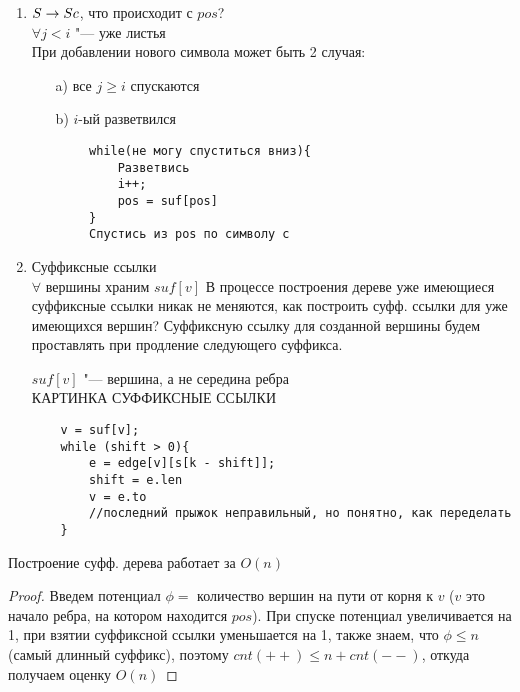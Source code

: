 \begin{enumerate}
\begin{proof}
		КАРТИНКА ДОКАЗАТЕЛЬСТВА ЛЕММЫ
	\end{proof}
	Таким образом, надо поддерживать самый длинный неразретвившийся суффикс, будем хранить его в переменной $pos$, как комбинацию вершины дерева, символа по которому надо пойти и сдвига на ребре ($pos$ может быть на середине ребра), $i$ "--- позиция начала суффикса
\item
	$ S \rightarrow Sc $, что происходит с $pos$? \\
	$\forall j < i$ "--- уже листья \\
	При добавлении нового символа может быть 2 случая:
	\begin{itemize}
	\item[a)]
		все $j \geqslant i$ спускаются
	\item[b)]
		$i$-ый разветвился
	\end{itemize}
	\begin{verbatim}
		while(не могу спуститься вниз){
			Разветвись
			i++;
			pos = suf[pos]
		}
		Спустись из pos по символу c
	\end{verbatim}
\item
	Суффиксные ссылки \\
	$\forall$ вершины храним $suf[v]$
	В процессе построения дереве уже имеющиеся суффиксные ссылки никак не меняются, как построить суфф. ссылки для уже имеющихся вершин? Суффиксную ссылку для созданной вершины будем проставлять при продление следующего суффикса.
	\begin{lemma}
		$suf[v]$ "--- вершина, а не середина ребра \\
		КАРТИНКА СУФФИКСНЫЕ ССЫЛКИ
	\end{lemma}
	\begin{verbatim}
	v = suf[v];
	while (shift > 0){
		e = edge[v][s[k - shift]];
		shift = e.len
		v = e.to
		//последний прыжок неправильный, но понятно, как переделать
	}
	\end{verbatim}
\end{enumerate}

\begin{theorem}
	Построение суфф. дерева работает за $O(n)$
\end{theorem}
\begin{proof}
	Введем потенциал $\phi =$ количество вершин на пути от корня к $v$ ($v$ это начало ребра, на котором находится $pos$). При спуске потенциал увеличивается на 1, при взятии суффиксной ссылки уменьшается на 1, также знаем, что $\phi \leqslant n$ (самый длинный суффикс), поэтому $cnt(++) \leqslant n + cnt(--)$, откуда получаем оценку $O(n)$
\end{proof}

